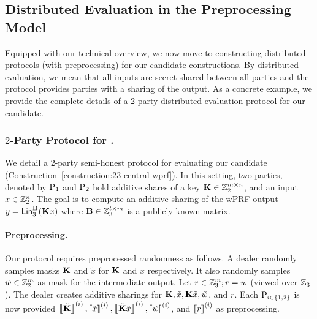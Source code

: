 \subsection{Distributed Evaluation in the Preprocessing Model}
\label{subsec:distributed_protocol}
Equipped with our technical overview, we now move to constructing distributed protocols (with preprocessing) for our candidate constructions. By distributed evaluation, we mean that all inputs are secret shared between all parties and the protocol provides parties with a sharing of the output. As a concrete example, we provide the complete details of a 2-party distributed evaluation protocol for our \ttwPRF candidate. 

\subsubsection{$2$-Party Protocol for \ttwPRF.}
\label{subsec:2pc-wprf}
We detail a $2$-party semi-honest protocol for evaluating our \ttwPRF candidate (Construction~\ref{construction:23-central-wprf}). In this setting, two parties, denoted by $\textnormal{P}_1$ and $\textnormal{P}_2$ hold additive shares of a key $\mat{K} \in \Z_2^{m \times n}$, and an input $x \in \mathbb{Z}_2^n$. The goal is to compute an additive sharing of the wPRF output $y = \LMap^\mat{B}_3(\mat{K}x)$ where $\mat{B} \in \Z_3^{t \times m}$ is a publicly known matrix.


\paragraph{Preprocessing.}
Our protocol requires preprocessed randomness as follows. A dealer randomly samples masks $\tilde{\mat{K}}$ and $\tilde{x}$ for $\mat{K}$ and $x$ respectively. It also randomly samples $\tilde{w} \in \mathbb{Z}_2^m$ as mask for the intermediate output. Let $r \in \mathbb{Z}_3^m; r = \tilde{w}$ (viewed over $\mathbb{Z}_3$). The dealer creates additive sharings for $\tilde{\mat{K}}, \tilde{x}, \tilde{\mat{K}}\tilde{x}, \tilde{w}$, and $r$. Each $\textnormal{P}_{i\in \{1,2\}}$ is now provided $\sharei{\tilde{\mat{K}}}, \sharei{\tilde{x}}, \sharei{\tilde{\mat{K}}\tilde{x}}, \sharei{\tilde{w}}$, and $\left\llbracket r \right\rrbracket^{(i)}$ as preprocessing.

